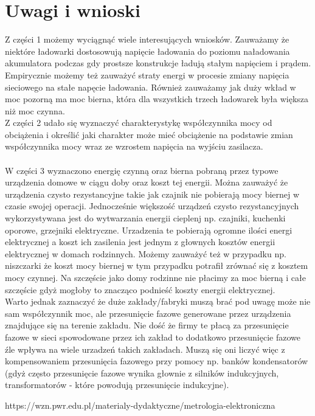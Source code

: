 \documentclass[11pt]{article}
\begin{document}
    \section{Uwagi i wnioski}
    Z części 1 możemy wyciągnąć wiele interesujących wniosków. Zauważamy że niektóre ładowarki dostosowują napięcie ładowania do poziomu naładowania akumulatora podczas
    gdy prostsze konstrukcje ładują stałym napięciem i prądem. Empirycznie możemy też zauważyć straty energi w procesie zmiany napięcia sieciowego na stałe napęcie ładowania.
    Również zauważamy jak duży wkład w moc pozorną ma moc bierna, która dla wszystkich trzech ładowarek była większa niż moc czynna.\\
    \newpage
    \indent Z części 2 udało się wyznaczyć charakterystykę współczynnika mocy od obciążenia i określić jaki charakter może mieć obciążenie na podstawie zmian współczynnika mocy wraz ze wzrostem
    napięcia na wyjściu zasilacza.\\
    \\
    \indent  W części 3 wyznaczono energię czynną oraz bierna pobraną przez typowe urządzenia domowe w ciągu doby oraz koszt tej energii. Można zauważyć że urządzenia czysto rezystancyjne
    takie jak czajnik nie pobierają mocy biernej w czasie swojej operacji. Jednocześnie większość urządzeń czysto rezystancyjnych wykorzystywana jest do wytwarzania energii cieplenj
    np. czajniki, kuchenki oporowe, grzejniki elektryczne. Urzadzenia te pobierają ogromne ilości energi elektrycznej a koszt ich zasilenia jest jednym z głownych kosztów energii
    elektrycznej w domach rodzinnych. Możemy zauważyć też w przypadku np. niszczarki że koszt mocy biernej w tym przypadku potrafił zrównać się z kosztem mocy czynnej. Na szczęście
    jako domy rodzinne nie płacimy za moc bierną i całe szczęście gdyż mogłoby to znacząco podnieść koszty energii elektrycznej.\\
    \indent Warto jednak zaznaczyć że duże zakłady/fabryki muszą brać pod uwagę może nie sam współczynnik moc, ale przesunięcie fazowe generowane przez urządzenia znajdujące się
    na terenie zakładu. Nie dość że firmy te płacą za przesunięcie fazowe w sieci spowodowane przez ich zakład to dodatkowo przesunięcie fazowe źle wpływa na wiele urzadzeń
    takich zakładach. Muszą się oni liczyć więc z kompensowaniem przesunięcia fazowego przy pomocy np. banków kondensatorów (gdyż często przesunięcie fazowe wynika głownie z silników
    indukcyjnych, transformatorów - które powodują przesunięcie indukcyjne).

    \vfill
    \footnotesize
    \begin{thebibliography}{9}
        https://wzn.pwr.edu.pl/materialy-dydaktyczne/metrologia-elektroniczna
    \end{thebibliography}
\end{document}
